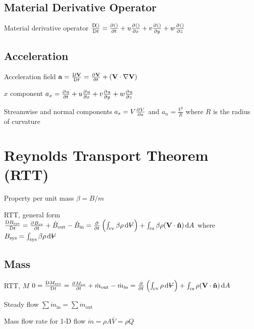 \documentclass{article}
\begin{document}
\subsection{Material Derivative Operator}
\begin{description*}
\item[Material derivative operator]
  \(\frac{\Dif ()}{\Dif t} = \pd{()}{t} + u\pd{()}{x} + v\pd{()}{y} + w\pd{()}{z}\)
\end{description*}


\subsection{Acceleration}
\begin{description*}
\item[Acceleration field]
  \(\vec a = \frac{\Dif\vec{V}}{\Dif t} = \pd{\vec V}{t} + (\vec{V}\cdot\vec\nabla\vec{V})\)
\item[$x$ component]
  \(a_x = \pd{u}{t} + u\pd{u}{x} + v\pd{u}{y} + w\pd{u}{z}\)
\item[Streamwise and normal components]
  \(a_s = V\pd{V}{s}\) and \(a_n = \frac{V^2}{R}\)
  where $R$ is the radius of curvature
\end{description*}

\section{Reynolds Transport Theorem (RTT)}
\begin{description*}
\item[Property per unit mass]
  \(\beta = B/m\)
\item[RTT, general form]
  \(\frac{\Dif B_\mathrm{sys}}{\Dif t}
  = \pd{B_\mathrm{cv}}{t}+\dot{B}_\mathrm{out} - \dot{B}_\mathrm{in}
  = \pd{}{t}\left(\int_\mathrm{cv}\beta\rho\dif{\volsym}\right)
  + \int_\mathrm{cs}\beta\rho(\vec{V}\cdot\uvec{n})\dif{A}\)
  where
  \(B_\mathrm{sys} = \int_\mathrm{sys}\beta\rho\dif{\volsym}\)
\end{description*}

\subsection{Mass}
\begin{description*}
\item[RTT, $M$]
  \(0 = \frac{\Dif M_\mathrm{sys}}{\Dif t}
  = \pd{M_\mathrm{cv}}{t}+\dot{m}_\mathrm{out}-\dot{m}_\mathrm{in}
  = \pd{}{t}\left(\int_\mathrm{cv}\rho\dif{\volsym}\right)
  + \int_\mathrm{cs}\rho(\vec{V}\cdot\uvec{n})\dif{A}\)
\item[Steady flow]
  \(\sum\dot{m}_\mathrm{in} = \sum\dot{m}_\mathrm{out}\)
\item[Mass flow rate for 1-D flow]
  \(\dot{m} = \rho A \bar{V} = \rho Q\)
\end{description*}
\end{document}
